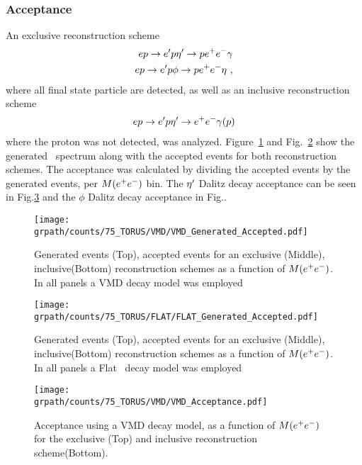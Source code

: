 \subsubsection{Acceptance}\label{sec.reconstruction}
An exclusive reconstruction scheme
\begin{align}
ep\to e'p \eta^{\prime} \rightarrow p e^+e^- \gamma  \\
ep\to e'p \phi \rightarrow p e^+e^- \eta \ ,
\end{align}
where all final state particle are detected, as well as an inclusive reconstruction scheme
\begin{align}
ep\to e'p \eta^{\prime} \rightarrow e^+e^- \gamma (p) \\
\end{align}
where the proton was not detected, was analyzed. Figure~\ref{fig:VMD} and Fig.~\ref{fig:FLAT} show the generated \epemT \ spectrum along with the accepted events for both reconstruction schemes. The acceptance was calculated by dividing the accepted events by the generated events, per $M(\epem)$ bin. The $\eta^{\prime}$ Dalitz decay acceptance can be seen in Fig.\ref{fig:VMDaccepted} and the $\phi$ Dalitz decay acceptance in Fig..
\begin{figure}[h!]\begin{center}
		\texttt{[image: \\grpath/counts/75\_TORUS/VMD/VMD\_Generated\_Accepted.pdf]}
		\caption[Generated and Accepted counts, as a function of $M(\epem)$]{\label{fig:VMD}{Generated events (Top), accepted events for an exclusive (Middle), inclusive(Bottom) reconstruction schemes as a function of $M(\epem)$. In all panels a VMD decay model was employed}}
\end{center}\end{figure}
\begin{figure}[h!]\begin{center}
			\texttt{[image: \\grpath/counts/75\_TORUS/FLAT/FLAT\_Generated\_Accepted.pdf]}
			\caption[Generated and Accepted counts, as a function of $M(\epem)$]{\label{fig:FLAT}{Generated events (Top), accepted events for an exclusive (Middle), inclusive(Bottom) reconstruction schemes as a function of $M(\epem)$. In all panels a Flat \epemT \ decay model was employed}}
\end{center}\end{figure}
\FloatBarrier

\begin{figure}[h!]\begin{center}
		\texttt{[image: \\grpath/counts/75\_TORUS/VMD/VMD\_Acceptance.pdf]}
		\caption[Acceptance, as a function of $M(\epem)$]{\label{fig:VMDaccepted}{Acceptance using a VMD decay model, as a function of $M(\epem)$ for the exclusive (Top) and inclusive reconstruction scheme(Bottom). }}
\end{center}\end{figure}

